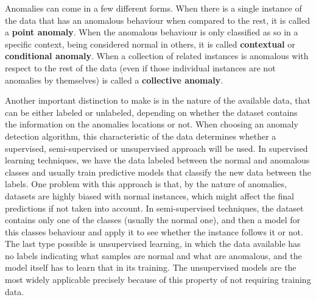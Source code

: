 \documentclass[../main.tex]{subfiles}
\begin{document}
        Anomalies can come in a few different forms. When there is a single instance of the data that has an anomalous behaviour when compared to the rest, it is called a \textbf{point anomaly}. When the anomalous behaviour is only classified as so in a specific context, being considered normal in others, it is called \textbf{contextual} or \textbf{conditional anomaly}. When a collection of related instances is anomalous with respect to the rest of the data (even if those individual instances are not anomalies by themselves) is called a \textbf{collective anomaly}. \par

        Another important distinction to make is in the nature of the available data, that can be either labeled or unlabeled, depending on whether the dataset contains the information on the anomalies locations or not. When choosing an anomaly detection algorithm, this characteristic of the data determines whether a supervised, semi-supervised or unsupervised approach will be used. In supervised learning techniques, we have the data labeled between the normal and anomalous classes and usually train predictive models that classify the new data between the labels. One problem with this approach is that, by the nature of anomalies, datasets are highly biased with normal instances, which might affect the final predictions if not taken into account. In semi-supervised techniques, the dataset contains only one of the classes (usually the normal one), and then a model for this classes behaviour and apply it to see whether the instance follows it or not. The last type possible is unsupervised learning, in which the data available has no labels indicating what samples are normal and what are anomalous, and the model itself has to learn that in its training. The unsupervised models are the most widely applicable precisely because of this property of not requiring training data.
\end{document}
